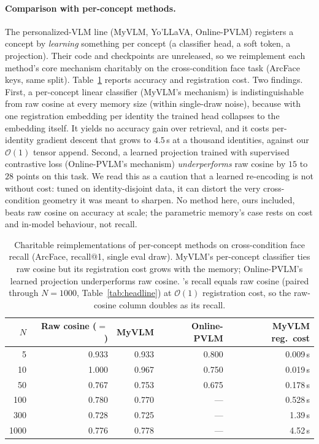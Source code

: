\paragraph{Comparison with per-concept methods.} The personalized-VLM line (MyVLM, Yo'LLaVA, Online-PVLM) registers a concept by \emph{learning} something per concept (a classifier head, a soft token, a projection). Their code and checkpoints are unreleased, so we reimplement each method's core mechanism charitably on the cross-condition face task (ArcFace keys, same split). Table~\ref{tab:perconcept} reports accuracy and registration cost. Two findings. First, a per-concept linear classifier (MyVLM's mechanism) is indistinguishable from raw cosine at every memory size (within single-draw noise), because with one registration embedding per identity the trained head collapses to the embedding itself. It yields no accuracy gain over retrieval, and it costs per-identity gradient descent that grows to $4.5$\,s at a thousand identities, against our $\mathcal{O}(1)$ tensor append. Second, a learned projection trained with supervised contrastive loss (Online-PVLM's mechanism) \emph{underperforms} raw cosine by $15$ to $28$ points on this task. We read this as a caution that a learned re-encoding is not without cost: tuned on identity-disjoint data, it can distort the very cross-condition geometry it was meant to sharpen. No method here, ours included, beats raw cosine on accuracy at scale; the parametric memory's case rests on cost and in-model behaviour, not recall.

\begin{table}[h]
\small\centering
\caption{Charitable reimplementations of per-concept methods on cross-condition face recall (ArcFace, recall@1, single eval draw). MyVLM's per-concept classifier ties raw cosine but its registration cost grows with the memory; Online-PVLM's learned projection underperforms raw cosine. \attmem{}'s recall equals raw cosine (paired through $N{=}1000$, Table~\ref{tab:headline}) at $\mathcal{O}(1)$ registration cost, so the raw-cosine column doubles as its recall.}
\label{tab:perconcept}
\begin{tabular}{@{}rrrrr@{}}
\toprule
$N$ & \textbf{Raw cosine ($=$ \attmem{})} & \textbf{MyVLM} & \textbf{Online-PVLM} & \textbf{MyVLM reg.\ cost} \\
\midrule
5    & 0.933 & 0.933 & 0.800 & 0.009\,s \\
10   & 1.000 & 0.967 & 0.750 & 0.019\,s \\
50   & 0.767 & 0.753 & 0.675 & 0.178\,s \\
100  & 0.780 & 0.770 & ---   & 0.528\,s \\
300  & 0.728 & 0.725 & ---   & 1.39\,s \\
1000 & 0.776 & 0.778 & ---   & 4.52\,s \\
\bottomrule
\end{tabular}
\end{table}


